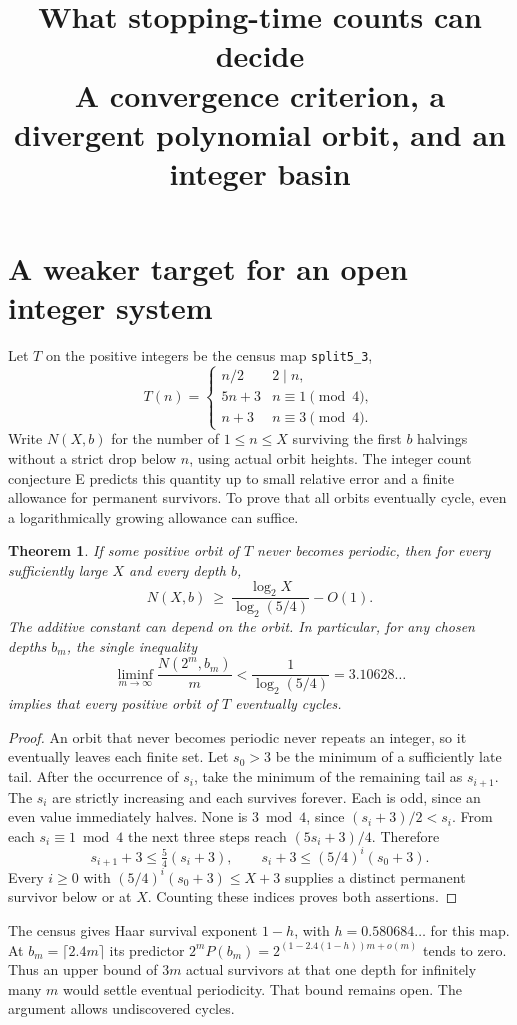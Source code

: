 \documentclass[11pt,a4paper]{article}
\title{What stopping-time counts can decide\\[2pt]\large A convergence criterion, a divergent polynomial orbit, and an integer basin}
\author{}\date{}
\newtheorem{theorem}{Theorem}
\begin{document}
\maketitle\vspace{-3em}
\section{A weaker target for an open integer system}
Let $T$ on the positive integers be the census map \texttt{split5\_3},
\[
 T(n)=\begin{cases}n/2&2\mid n,\\5n+3& n\equiv1\pmod4,\\n+3&n\equiv3\pmod4.\end{cases}
\]
Write $N(X,b)$ for the number of $1\le n\le X$ surviving the first $b$ halvings without a strict drop below $n$, using actual orbit heights. The integer count conjecture E predicts this quantity up to small relative error and a finite allowance for permanent survivors. To prove that all orbits eventually cycle, even a logarithmically growing allowance can suffice.
\begin{theorem}\label{thm:records}
If some positive orbit of $T$ never becomes periodic, then for every sufficiently large $X$ and every depth $b$,
\[
  N(X,b)\ \ge\ \frac{\log_2 X}{\log_2(5/4)}-O(1).
\]
The additive constant can depend on the orbit. In particular, for any chosen depths $b_m$, the single inequality
\[
 \liminf_{m\to\infty}\frac{N(2^m,b_m)}m
 < \frac1{\log_2(5/4)}=3.10628\ldots
\]
implies that every positive orbit of $T$ eventually cycles.
\end{theorem}
\begin{proof}
An orbit that never becomes periodic never repeats an integer, so it eventually leaves each finite set. Let $s_0>3$ be the minimum of a sufficiently late tail. After the occurrence of $s_i$, take the minimum of the remaining tail as $s_{i+1}$. The $s_i$ are strictly increasing and each survives forever. Each is odd, since an even value immediately halves. None is $3\bmod4$, since $(s_i+3)/2<s_i$. From each $s_i\equiv1\bmod4$ the next three steps reach $(5s_i+3)/4$. Therefore
\[
 s_{i+1}+3\le\tfrac54(s_i+3),\qquad s_i+3\le(5/4)^i(s_0+3).
\]
Every $i\ge0$ with $(5/4)^i(s_0+3)\le X+3$ supplies a distinct permanent survivor below or at $X$. Counting these indices proves both assertions.
\end{proof}
The census gives Haar survival exponent $1-h$, with $h=0.580684\ldots$ for this map. At $b_m=\lceil 2.4m\rceil$ its predictor $2^m P(b_m)=2^{(1-2.4(1-h))m+o(m)}$ tends to zero. Thus an upper bound of $3m$ actual survivors at that one depth for infinitely many $m$ would settle eventual periodicity. That bound remains open. The argument allows undiscovered cycles.
\end{document}
